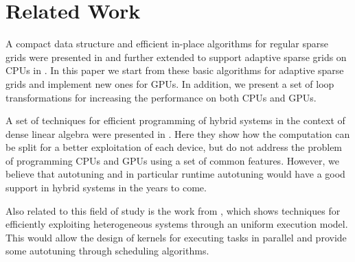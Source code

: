 \section{Related Work}
A compact data structure and efficient in-place algorithms for regular sparse
grids were presented in \cite{Murarasu:2011:CDS:1941553.1941559} and further extended to support
adaptive sparse grids on CPUs in \cite{murarasu12fastsg:}. In this paper we start
from these basic algorithms for adaptive sparse grids and implement new ones for
GPUs. In addition, we present a set of loop transformations for increasing
the performance on both CPUs and GPUs.

A set of techniques for efficient programming of hybrid systems in the context
of dense linear algebra were presented in \cite{Tomov:2010:TDL:1805333.1805388}.
Here they show how the computation can be split for a better exploitation of
each device, but do not address the problem of programming CPUs and GPUs using a
set of common features. However, we believe that autotuning and in particular
runtime autotuning would have a good support in hybrid systems in the years to
come.

Also related to this field of study is the work from
\cite{Augonnet:2011:SUP:1951453.1951454}, which shows techniques for efficiently
exploiting heterogeneous systems through an uniform execution model. This would
allow the design of kernels for executing tasks in parallel and provide some
autotuning through scheduling algorithms.
